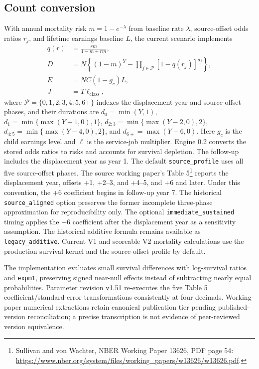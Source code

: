 \documentclass[10pt]{article}
\begin{document}
\subsection{Count conversion}
With annual mortality risk $m=1-e^{-\lambda}$ from baseline rate $\lambda$, source-offset odds ratios $r_j$,
and lifetime earnings baseline $L$, the current scenario implements
\begin{align}
 q(r) &= \frac{rm}{1-m+rm},\\
 D &= N\left\{(1-m)^Y-\prod_{j\in\mathcal P}[1-q(r_j)]^{d_j}\right\},\\
 E &= NC(1-g_c)L,\\
 J &= T\ell_{\mathrm{class}},
\end{align}
where $\mathcal P=\{0,1,2{:}3,4{:}5,6+\}$ indexes the displacement-year
and source-offset phases, and their durations are
$d_0=\min(Y,1)$, $d_1=\min\{\max(Y-1,0),1\}$,
$d_{2{:}3}=\min\{\max(Y-2,0),2\}$,
$d_{4{:}5}=\min\{\max(Y-4,0),2\}$, and
$d_{6+}=\max(Y-6,0)$. Here $g_c$ is the child earnings level and $\ell$
is the service-job multiplier. Engine 0.2 converts the stored odds ratios
to risks and accounts for survival depletion. The follow-up includes the
displacement year as year 1. The default \texttt{source\_profile} uses all
five source-offset phases. The source working paper's Table 5\footnote{Sullivan and von
Wachter, NBER Working Paper 13626, PDF page 54:
\url{https://www.nber.org/system/files/working_papers/w13626/w13626.pdf}.}
reports the displacement year, offsets +1, +2--3, and +4--5, and +6 and
later. Under this convention, the +6 coefficient begins in follow-up year
7. The historical \texttt{source\_aligned} option preserves the former
incomplete three-phase approximation for reproducibility only. The optional
\texttt{immediate\_sustained} timing applies the +6 coefficient after the
displacement year as a sensitivity assumption. The historical additive
formula remains available as \texttt{legacy\_additive}. Current V1 and
scoreable V2 mortality calculations use the production survival kernel and
the source-offset profile by default.

The implementation evaluates small survival differences with log-survival
ratios and \texttt{expm1}, preserving signed near-null effects instead of
subtracting nearly equal probabilities. Parameter revision v1.51 re-executes
the five Table 5 coefficient/standard-error transformations consistently at
four decimals. Working-paper numerical extractions retain canonical
publication tier pending published-version reconciliation; a precise
transcription is not evidence of peer-reviewed version equivalence.
\end{document}
